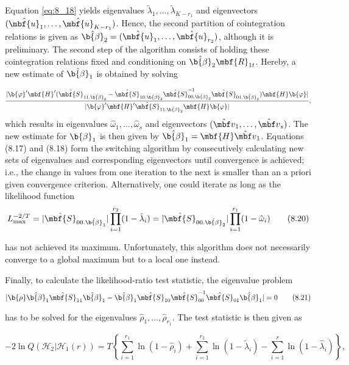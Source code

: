 Equation \eqref{eq:8_18} yields eigenvalues $\tilde{\lambda}_1,\ldots,\tilde{\lambda}_{K-r_1}$ and eigenvectors $(\hat{\mbf{u}}_1,\ldots,\hat{\mbf{u}}_{K-r_1})$. Hence, the second partition of cointegration relations is given as $\hat{\b{\beta}}_2 = (\hat{\mbf{u}}_1,\ldots,\hat{\mbf{u}}_{r_2})$, although it is preliminary. The second step of the algorithm consists of holding these cointegration relations fixed and conditioning on $\hat{\b{\beta}}_2\mbf{R}_{1t}$. Hereby, a new estimate of $\hat{\b{\beta}}_1$ is obtained by solving

\begin{equation}
\frac{|\b{\varphi}'\mbf{H}'(\hat{\mbf{S}}_{11.\hat{\b{\beta}}_2} - \hat{\mbf{S}}_{10.\hat{\b{\beta}}_2}\hat{\mbf{S}}_{00.\hat{\b{\beta}}_2}^{-1}\hat{\mbf{S}}_{01.\hat{\b{\beta}}_2})\mbf{H}\b{\varphi}|}{|\b{\varphi}'\mbf{H}'\hat{\mbf{S}}_{11.\hat{\b{\beta}}_2}\mbf{H}\b{\varphi}|},
\end{equation}
which results in eigenvalues $\hat{\omega}_1,\ldots,\hat{\omega}_s$ and eigenvectors $(\hat{\mbf v}_1,\ldots,\hat{\mbf v}_s)$. The new estimate for $\b{\beta}_1$ is then given by $\hat{\b{\beta}}_1 = \mbf{H}\hat{\mbf v}_1$. Equations (8.17) and (8.18) form the switching algorithm by consecutively calculating new sets of eigenvalues and corresponding eigenvectors until convergence is achieved; i.e., the change in values from one iteration to the next is smaller than an a priori given convergence criterion. Alternatively, one could iterate as long as the likelihood function
\begin{equation}
L_{\text{max}}^{-2/T} = |\hat{\mbf{S}}_{00.\hat{\b{\beta}}_1}|\prod_{i=1}^{r_2}(1-\hat{\lambda}_i) = |\hat{\mbf{S}}_{00.\hat{\b{\beta}}_2}|\prod_{i=1}^{r_1}(1-\hat{\omega}_i)
\tag{8.20}
\end{equation}

has not achieved its maximum. Unfortunately, this algorithm does not necessarily converge to a global maximum but to a local one instead.

Finally, to calculate the likelihood-ratio test statistic, the eigenvalue problem
\begin{equation}
|\b{\rho} \hat{\b{\beta}}_1\hat{\mbf{S}}_{11}\hat{\b{\beta}}_1 - \hat{\b{\beta}}_1\hat{\mbf{S}}_{10}\hat{\mbf{S}}_{00}^{-1}\hat{\mbf{S}}_{01}\hat{\b{\beta}}_1| = 0
\tag{8.21}
\end{equation}

has to be solved for the eigenvalues $\hat{\rho}_1,\ldots,\hat{\rho}_{r_1}$. The test statistic is then given as

\begin{equation}
-2\ln Q(\mathcal{H}_2|\mathcal{H}_1(r)) = T\left\{\sum_{i=1}^{r_1}\ln(1-\hat{\rho}_i) + \sum_{i=1}^{r_2}\ln(1-\tilde{\lambda}_i) - \sum_{i=1}^{r}\ln(1-\hat{\lambda}_i)\right\},
\tag{8.22}
\end{equation}